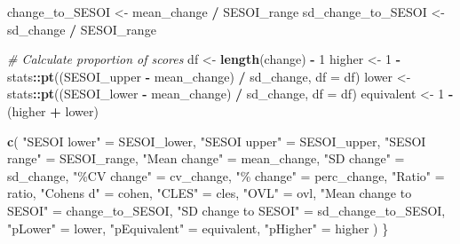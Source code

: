 \documentclass[
]{book}
\newenvironment{Shaded}{\begin{snugshade}}{\end{snugshade}}
\newcommand{\CommentTok}[1]{\textcolor[rgb]{0.56,0.35,0.01}{\textit{#1}}}
\newcommand{\DataTypeTok}[1]{\textcolor[rgb]{0.13,0.29,0.53}{#1}}
\newcommand{\DecValTok}[1]{\textcolor[rgb]{0.00,0.00,0.81}{#1}}
\newcommand{\KeywordTok}[1]{\textcolor[rgb]{0.13,0.29,0.53}{\textbf{#1}}}
\newcommand{\NormalTok}[1]{#1}
\newcommand{\OperatorTok}[1]{\textcolor[rgb]{0.81,0.36,0.00}{\textbf{#1}}}
\newcommand{\StringTok}[1]{\textcolor[rgb]{0.31,0.60,0.02}{#1}}
\begin{document}
\begin{Shaded}
\begin{Highlighting}[]
\NormalTok{  change\_to\_SESOI <{-}}\StringTok{ }\NormalTok{mean\_change }\OperatorTok{/}\StringTok{ }\NormalTok{SESOI\_range}
\NormalTok{  sd\_change\_to\_SESOI <{-}}\StringTok{ }\NormalTok{sd\_change }\OperatorTok{/}\StringTok{ }\NormalTok{SESOI\_range}

  \CommentTok{\# Calculate proportion of scores}
\NormalTok{  df <{-}}\StringTok{ }\KeywordTok{length}\NormalTok{(change) }\OperatorTok{{-}}\StringTok{ }\DecValTok{1}
\NormalTok{  higher <{-}}\StringTok{ }\DecValTok{1} \OperatorTok{{-}}\StringTok{ }\NormalTok{stats}\OperatorTok{::}\KeywordTok{pt}\NormalTok{((SESOI\_upper }\OperatorTok{{-}}\StringTok{ }\NormalTok{mean\_change) }\OperatorTok{/}\StringTok{ }\NormalTok{sd\_change, }\DataTypeTok{df =}\NormalTok{ df)}
\NormalTok{  lower <{-}}\StringTok{ }\NormalTok{stats}\OperatorTok{::}\KeywordTok{pt}\NormalTok{((SESOI\_lower }\OperatorTok{{-}}\StringTok{ }\NormalTok{mean\_change) }\OperatorTok{/}\StringTok{ }\NormalTok{sd\_change, }\DataTypeTok{df =}\NormalTok{ df)}
\NormalTok{  equivalent <{-}}\StringTok{ }\DecValTok{1} \OperatorTok{{-}}\StringTok{ }\NormalTok{(higher }\OperatorTok{+}\StringTok{ }\NormalTok{lower)}

  \KeywordTok{c}\NormalTok{(}
    \StringTok{"SESOI lower"}\NormalTok{ =}\StringTok{ }\NormalTok{SESOI\_lower,}
    \StringTok{"SESOI upper"}\NormalTok{ =}\StringTok{ }\NormalTok{SESOI\_upper,}
    \StringTok{"SESOI range"}\NormalTok{ =}\StringTok{ }\NormalTok{SESOI\_range,}
    \StringTok{"Mean change"}\NormalTok{ =}\StringTok{ }\NormalTok{mean\_change,}
    \StringTok{"SD change"}\NormalTok{ =}\StringTok{ }\NormalTok{sd\_change,}
    \StringTok{"\%CV change"}\NormalTok{ =}\StringTok{ }\NormalTok{cv\_change,}
    \StringTok{"\% change"}\NormalTok{ =}\StringTok{ }\NormalTok{perc\_change,}
    \StringTok{"Ratio"}\NormalTok{ =}\StringTok{ }\NormalTok{ratio,}
    \StringTok{"Cohen\textquotesingle{}s d"}\NormalTok{ =}\StringTok{ }\NormalTok{cohen,}
    \StringTok{"CLES"}\NormalTok{ =}\StringTok{ }\NormalTok{cles,}
    \StringTok{"OVL"}\NormalTok{ =}\StringTok{ }\NormalTok{ovl,}
    \StringTok{"Mean change to SESOI"}\NormalTok{ =}\StringTok{ }\NormalTok{change\_to\_SESOI,}
    \StringTok{"SD change to SESOI"}\NormalTok{ =}\StringTok{ }\NormalTok{sd\_change\_to\_SESOI,}
    \StringTok{"pLower"}\NormalTok{ =}\StringTok{ }\NormalTok{lower,}
    \StringTok{"pEquivalent"}\NormalTok{ =}\StringTok{ }\NormalTok{equivalent,}
    \StringTok{"pHigher"}\NormalTok{ =}\StringTok{ }\NormalTok{higher}
\NormalTok{  )}
\NormalTok{\}}



\end{Highlighting}
\end{Shaded}
\end{document}
